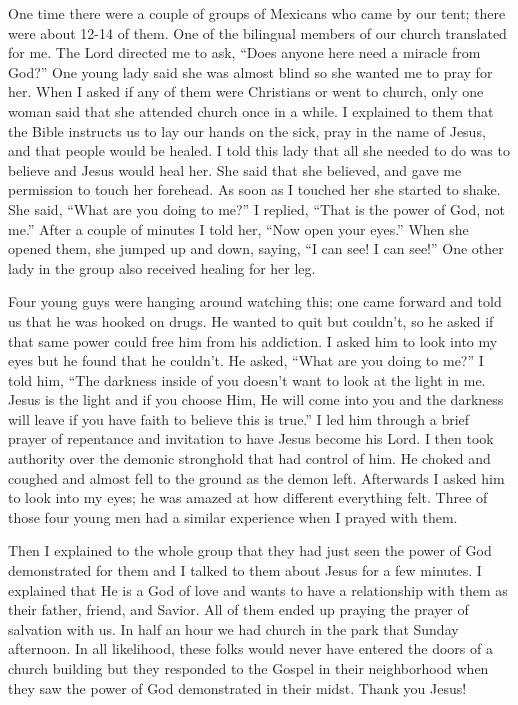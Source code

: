\documentclass[twoside, 12pt]{book}
\begin{document}
One time there were a couple of groups of Mexicans who came by our tent; there were about 12-14 of them. One of the bilingual members of our church translated for me. The Lord directed me to ask, “Does anyone here need a miracle from God?” One young lady said she was almost blind so she wanted me to pray for her. When I asked if any of them were Christians or went to church, only one woman said that she attended church once in a while. I explained to them that the Bible instructs us to lay our hands on the sick, pray in the name of Jesus, and that people would be healed. I told this lady that all she needed to do was to believe and Jesus would heal her. She said that she believed, and gave me permission to touch her forehead. As soon as I touched her she started to shake. She said, “What are you doing to me?” I replied, “That is the power of God, not me.” After a couple of minutes I told her, “Now open your eyes.” When she opened them, she jumped up and down, saying, “I can see! I can see!” One other lady in the group also received healing for her leg. 

Four young guys were hanging around watching this; one came forward and told us that he was hooked on drugs. He wanted to quit but couldn’t, so he asked if that same power could free him from his addiction. I asked him to look into my eyes but he found that he couldn’t. He asked, “What are you doing to me?” I told him, “The darkness inside of you doesn’t want to look at the light in me. Jesus is the light and if you choose Him, He will come into you and the darkness will leave if you have faith to believe this is true.” I led him through a brief prayer of repentance and invitation to have Jesus become his Lord. I then took authority over the demonic stronghold that had control of him. He choked and coughed and almost fell to the ground as the demon left. Afterwards I asked him to look into my eyes; he was amazed at how different everything felt. Three of those four young men had a similar experience when I prayed with them.

Then I explained to the whole group that they had just seen the power of God demonstrated for them and I talked to them about Jesus for a few minutes. I explained that He is a God of love and wants to have a relationship with them as their father, friend, and Savior. All of them ended up praying the prayer of salvation with us. In half an hour we had church in the park that Sunday afternoon. In all likelihood, these folks would never have entered the doors of a church building but they responded to the Gospel in their neighborhood when they saw the power of God demonstrated in their midst. Thank you Jesus!
\end{document}
